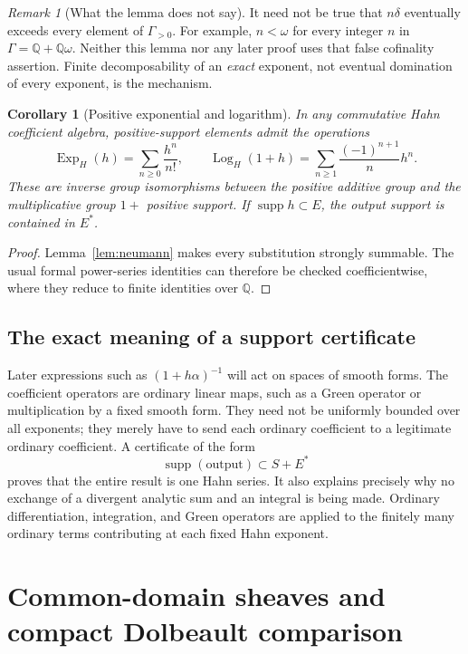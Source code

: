 \documentclass[11pt,letterpaper]{article}
\numberwithin{equation}{section}
\newtheorem{corollary}[theorem]{Corollary}
\theoremstyle{definition}
\theoremstyle{remark}
\newtheorem{remark}[theorem]{Remark}
\newcommand{\Q}{\mathbb Q}
\newcommand{\supp}{\operatorname{supp}}
\newcommand{\Exp}{\operatorname{Exp}_{H}}
\newcommand{\Log}{\operatorname{Log}_{H}}
\begin{document}
\begin{remark}[What the lemma does not say]
\label{rem:nonarch}
It need not be true that $n\delta$ eventually exceeds every element of
$\Gamma_{>0}$. For example, $n<\omega$ for every integer $n$ in
$\Gamma=\Q+\Q\omega$. Neither this lemma nor any later proof uses that
false cofinality assertion. Finite decomposability of an \emph{exact}
exponent, not eventual domination of every exponent, is the mechanism.
\end{remark}

\begin{corollary}[Positive exponential and logarithm]
\label{cor:explog}
In any commutative Hahn coefficient algebra, positive-support elements
admit the operations
\[
 \Exp(h)=\sum_{n\ge0}\frac{h^n}{n!},\qquad
 \Log(1+h)=\sum_{n\ge1}\frac{(-1)^{n+1}}n h^n.
\]
These are inverse group isomorphisms between the positive additive group
and the multiplicative group $1+$ positive support. If $\supp h\subset E$,
the output support is contained in $E^*$.
\end{corollary}
\begin{proof}
Lemma~\ref{lem:neumann} makes every substitution strongly summable.
The usual formal power-series identities can therefore be checked
coefficientwise, where they reduce to finite identities over $\Q$.
\end{proof}

\subsection{The exact meaning of a support certificate}
Later expressions such as $(1+h\alpha)^{-1}$ will act on spaces of smooth
forms. The coefficient operators are ordinary linear maps, such as a
Green operator or multiplication by a fixed smooth form. They need not
be uniformly bounded over all exponents; they merely have to send each
ordinary coefficient to a legitimate ordinary coefficient.
A certificate of the form
\begin{equation}
 \supp(\text{output})\subset S+E^*
 \label{eq:certificate}
\end{equation}
proves that the entire result is one Hahn series. It also explains
precisely why no exchange of a divergent analytic sum and an integral is
being made. Ordinary differentiation, integration, and Green operators
are applied to the finitely many ordinary terms contributing at each
fixed Hahn exponent.

\section{Common-domain sheaves and compact Dolbeault comparison}
\label{sec:dolbeault}
\end{document}
